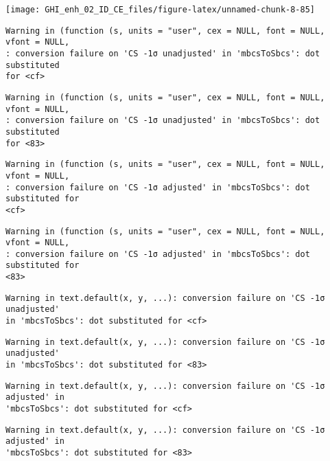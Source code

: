 \documentclass[
  10pt,
  a4paper,oneside]{article}
\begin{document}
\begin{center}\texttt{[image: GHI\_enh\_02\_ID\_CE\_files/figure-latex/unnamed-chunk-8-85]} \end{center}

\begin{verbatim}
Warning in (function (s, units = "user", cex = NULL, font = NULL, vfont = NULL,
: conversion failure on 'CS -1σ unadjusted' in 'mbcsToSbcs': dot substituted
for <cf>
\end{verbatim}

\begin{verbatim}
Warning in (function (s, units = "user", cex = NULL, font = NULL, vfont = NULL,
: conversion failure on 'CS -1σ unadjusted' in 'mbcsToSbcs': dot substituted
for <83>
\end{verbatim}

\begin{verbatim}
Warning in (function (s, units = "user", cex = NULL, font = NULL, vfont = NULL,
: conversion failure on 'CS -1σ adjusted' in 'mbcsToSbcs': dot substituted for
<cf>
\end{verbatim}

\begin{verbatim}
Warning in (function (s, units = "user", cex = NULL, font = NULL, vfont = NULL,
: conversion failure on 'CS -1σ adjusted' in 'mbcsToSbcs': dot substituted for
<83>
\end{verbatim}

\begin{verbatim}
Warning in text.default(x, y, ...): conversion failure on 'CS -1σ unadjusted'
in 'mbcsToSbcs': dot substituted for <cf>
\end{verbatim}

\begin{verbatim}
Warning in text.default(x, y, ...): conversion failure on 'CS -1σ unadjusted'
in 'mbcsToSbcs': dot substituted for <83>
\end{verbatim}

\begin{verbatim}
Warning in text.default(x, y, ...): conversion failure on 'CS -1σ adjusted' in
'mbcsToSbcs': dot substituted for <cf>
\end{verbatim}

\begin{verbatim}
Warning in text.default(x, y, ...): conversion failure on 'CS -1σ adjusted' in
'mbcsToSbcs': dot substituted for <83>
\end{verbatim}
\end{document}
